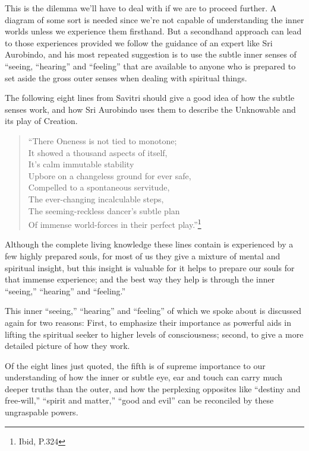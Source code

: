 \documentclass[12pt,a4paper]{book}
\begin{document}
This is the dilemma we'll have to deal with if we are to proceed
further. A diagram of some sort is needed since we're not capable of
understanding the inner worlds unless we experience them
firsthand. But a secondhand approach can lead to those experiences
provided we follow the guidance of an expert like Sri Aurobindo, and
his most repeated suggestion is to use the subtle inner senses of
``seeing, ``hearing'' and ``feeling'' that are available to anyone who
is prepared to set aside the gross outer senses when dealing with
spiritual things.

The following eight lines from Savitri should give a good idea of how
the subtle senses work, and how Sri Aurobindo uses them to describe
the Unknowable and its play of Creation.

\begin{verse}
``There Oneness is not tied to monotone;\\
It showed a thousand aspects of itself,\\
It's calm immutable stability\\
Upbore on a changeless ground for ever safe,\\
Compelled to a spontaneous servitude,\\
The ever-changing incalculable steps,\\
The seeming-reckless dancer's subtle plan\\
Of immense world-forces in their perfect play.''\footnote{Ibid, P.324}
\end{verse}

Although the complete living knowledge these lines contain is
experienced by a few highly prepared souls, for most of us they give a
mixture of mental and spiritual insight, but this insight is valuable
for it helps to prepare our souls for that immense experience; and the
best way they help is through the inner ``seeing,'' ``hearing'' and
``feeling.''


\label{label2}
This inner ``seeing,'' ``hearing'' and ``feeling'' of which we spoke
about is discussed again for two reasons: First, to emphasize their
importance as powerful aids in lifting the spiritual seeker to higher
levels of consciousness; second, to give a more detailed picture of
how they work.

Of the eight lines just quoted, the fifth is of supreme importance to
our understanding of how the inner or subtle eye, ear and touch can
carry much deeper truths than the outer, and how the perplexing
opposites like ``destiny and free-will,'' ``spirit and matter,''
``good and evil'' can be reconciled by these ungraspable powers.
\end{document}
